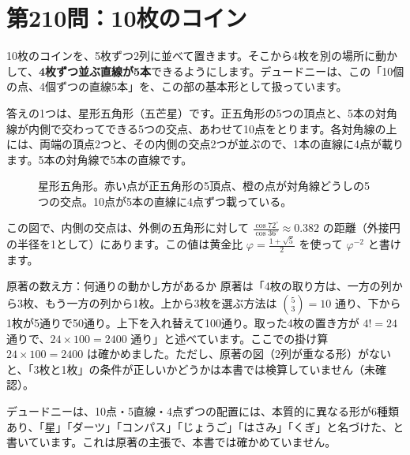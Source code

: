 \documentclass[a4paper,11pt,openany]{ltjsbook}
\begin{document}
\section{第210問：10枚のコイン}

10枚のコインを、5枚ずつ2列に並べて置きます。そこから4枚を別の場所に動かして、\textbf{4枚ずつ並ぶ直線が5本}できるようにします。デュードニーは、この「10個の点、4個ずつの直線5本」を、この部の基本形として扱っています。

答えの1つは、星形五角形（五芒星）です。正五角形の5つの頂点と、5本の対角線が内側で交わってできる5つの交点、あわせて10点をとります。各対角線の上には、両端の頂点2つと、その内側の交点2つが並ぶので、1本の直線に4点が載ります。5本の対角線で5本の直線です。

\begin{figure}[htbp]
\centering
{}
\caption{星形五角形。赤い点が正五角形の5頂点、橙の点が対角線どうしの5つの交点。10点が5本の直線に4点ずつ載っている。}
\end{figure}

この図で、内側の交点は、外側の五角形に対して $\tfrac{\cos72^\circ}{\cos36^\circ}\approx0.382$ の距離（外接円の半径を1として）にあります。この値は黄金比 $\varphi=\tfrac{1+\sqrt5}{2}$ を使って $\varphi^{-2}$ と書けます。

\begin{examplebox}{原著の数え方：何通りの動かし方があるか}
原著は「4枚の取り方は、一方の列から3枚、もう一方の列から1枚。上から3枚を選ぶ方法は $\binom{5}{3}=10$ 通り、下から1枚が5通りで50通り。上下を入れ替えて100通り。取った4枚の置き方が $4!=24$ 通りで、$24\times100=2400$ 通り」と述べています。ここでの掛け算 $24\times100=2400$ は確かめました。ただし、原著の図（2列が重なる形）がないと、「3枚と1枚」の条件が正しいかどうかは本書では検算していません（未確認）。
\end{examplebox}

デュードニーは、10点・5直線・4点ずつの配置には、本質的に異なる形が6種類あり、「星」「ダーツ」「コンパス」「じょうご」「はさみ」「くぎ」と名づけた、と書いています。これは原著の主張で、本書では確かめていません。
\end{document}
